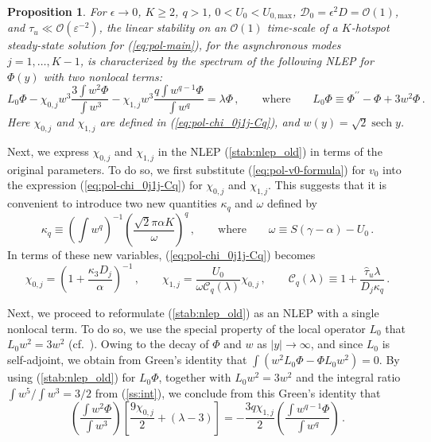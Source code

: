 \documentclass{article}%
\newtheorem{prop}[theorem]{Proposition}
\newcommand{\eps}{{\displaystyle \varepsilon}}
\DeclareMathOperator{\sech}{sech}
\begin{document}
\begin{prop}\label{main:stab_0} For $\epsilon\to 0$, $K\geq 2$, $q>1$, 
$0<U_0<U_{0,\textrm{max}}$, ${\mathcal D}_0=\epsilon^2 D = {\mathcal
    O}(1)$, and $\tau_u\ll {\mathcal O}(\eps^{-2})$, the linear
  stability on an ${\mathcal O}(1)$ time-scale of a $K$-hotspot
  steady-state solution for (\ref{eq:pol-main}), for the asynchronous
  modes $j=1,\ldots,K-1$, is characterized by the spectrum of the
  following NLEP for $\Phi(y)$ with two nonlocal terms:
\begin{equation}\label{stab:nlep_old}
  L_{0}\Phi- \chi_{0,j} w^3\frac{3 \int w^2\Phi }{\int w^3} - 
   \chi_{1,j} w^3 \frac{q \int w^{q-1} \Phi}{\int w^q} = \lambda
   \Phi\,, \qquad \mbox{where} \qquad
 L_{0}\Phi \equiv  \Phi^{\prime\prime}-\Phi+3w^{2}\Phi \,.
\end{equation}
Here $\chi_{0,j}$ and $\chi_{1,j}$ are defined in
(\ref{eq:pol-chi_0j1j-Cq}), and $w(y)=\sqrt{2}\sech y$.
\end{prop}

Next, we express $\chi_{0,j}$ and $\chi_{1,j}$ in the NLEP
(\ref{stab:nlep_old}) in terms of the original parameters. To do so,
we first substitute (\ref{eq:pol-v0-formula}) for $v_0$ into the
expression (\ref{eq:pol-chi_0j1j-Cq}) for $\chi_{0,j}$ and
$\chi_{1,j}$. This suggests that it is convenient to introduce two new
quantities $\kappa_q$ and $\omega$ defined by
\begin{equation}\label{stab:kappa_omega}
   \kappa_q \equiv \left( \int w^q \right)^{-1} 
  \left( \frac{\sqrt{2} \pi \alpha K}{\omega} \right)^{q} \,, \qquad
  \mbox{where} \qquad \omega \equiv S (\gamma -\alpha) - U_0 \,.
\end{equation}
In terms of these new variables, (\ref{eq:pol-chi_0j1j-Cq}) becomes
\begin{equation}\label{stab:newchi}
    \chi_{0,j} = \left( 1 + \frac{\kappa_3 D_j}{\alpha} \right)^{-1} \,,
  \qquad \chi_{1,j} = \frac{U_0}{\omega {\mathcal C}_q(\lambda)} \chi_{0,j}
   \,, \qquad 
{\mathcal C}_{q}(\lambda) \equiv 1+\frac{\hat{\tau}_u\lambda}{D_j \kappa_q} \,.
\end{equation} 

Next, we proceed to reformulate (\ref{stab:nlep_old}) as an NLEP
with a single nonlocal term. To do so, we use the special property of
the local operator $L_0$ that $L_{0}w^{2}=3w^{2}$
(cf.~\cite{kww_crime}). Owing to the decay of $\Phi$ and $w$ as
$|y|\to \infty$, and since $L_0$ is self-adjoint, we obtain from
Green's identity that $\int\left(w^{2}L_{0}\Phi-\Phi
L_{0}w^{2}\right)=0$. By using (\ref{stab:nlep_old}) for $L_0\Phi$,
together with $L_0w^2 = 3 w^2$ and the integral ratio
${\int w^5/\int w^3}={3/2}$ from (\ref{ss:int}), we conclude from this
Green's identity that
\begin{equation}\label{stab:key_ident}
   \left( \frac{\int w^2 \Phi}{\int w^3 }\right) \left[
   \frac{9\chi_{0,j}}{2} + (\lambda -3) \right] =
   - \frac{3q\chi_{1,j}}{2} \left( \frac{\int w^{q-1} \Phi}{\int w^q }\right) \,.
\end{equation}
\end{document}
